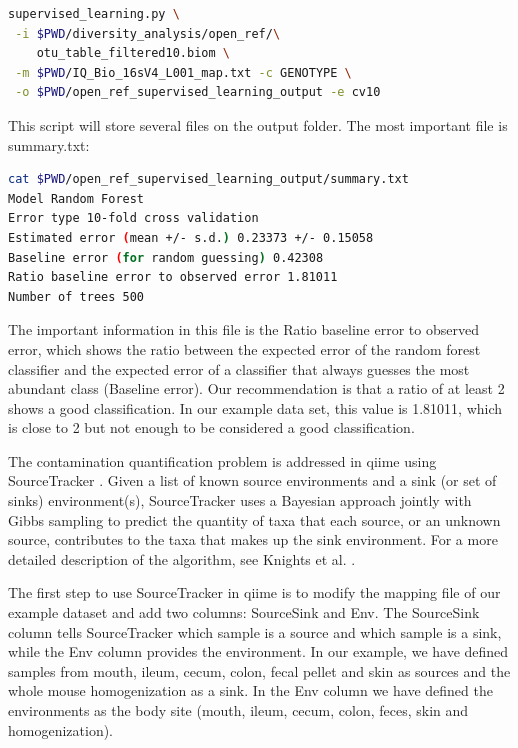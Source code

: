 \begin{lstlisting}[language=bash]
supervised_learning.py \
 -i $PWD/diversity_analysis/open_ref/\
    otu_table_filtered10.biom \
 -m $PWD/IQ_Bio_16sV4_L001_map.txt -c GENOTYPE \
 -o $PWD/open_ref_supervised_learning_output -e cv10
\end{lstlisting}

This script will store several files on the output folder. The most important file is summary.txt:

\begin{lstlisting}[language=bash]
cat $PWD/open_ref_supervised_learning_output/summary.txt
Model Random Forest
Error type 10-fold cross validation
Estimated error (mean +/- s.d.) 0.23373 +/- 0.15058
Baseline error (for random guessing) 0.42308
Ratio baseline error to observed error 1.81011
Number of trees 500
\end{lstlisting}

The important information in this file is the Ratio baseline error to observed error, which shows the
ratio between the expected error of the random forest classifier and the expected error of a classifier
that always guesses the most abundant class (Baseline error). Our recommendation is that a ratio of at
least 2 shows a good classification. In our example data set, this value is 1.81011, which is close to 2
but not enough to be considered a good classification.

The contamination quantification problem is addressed in \gls{qiime} using SourceTracker \cite{Knights2011}. Given a
list of known source environments and a sink (or set of sinks) environment(s), SourceTracker uses a Bayesian
approach jointly with Gibbs sampling to predict the quantity of taxa that each source, or an unknown source,
contributes to the taxa that makes up the sink environment. For a more detailed description of the algorithm,
see Knights et al. \cite{Knights2011}.

The first step to use SourceTracker in \gls{qiime} is to modify the mapping file of our example dataset and add two
columns: SourceSink and Env. The SourceSink column tells SourceTracker which sample is a source and which
sample is a sink, while the Env column provides the environment. In our example, we have defined samples from
mouth, ileum, cecum, colon, fecal pellet and skin as sources and the whole mouse homogenization as a sink. In
the Env column we have defined the environments as the body site (mouth, ileum, cecum, colon, feces, skin and homogenization).

